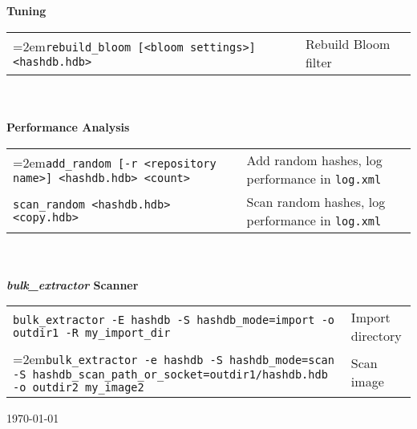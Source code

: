 \documentclass[12pt]{article}
\newcommand{\bulk}{\emph{bulk\_extractor}\xspace}
\begin{document}
\\
\\
\textbf{Tuning}\\
\begin{tabular}{p{3.6 in} p{4 in}}
\hangindent=2em\small\texttt{rebuild\_bloom [<bloom settings>] <hashdb.hdb>} & Rebuild Bloom filter \\
\end{tabular}
\\
\\
\textbf{Performance Analysis}\\
\begin{tabular}{p{3.6 in} p{4 in}}
\hangindent=2em\small\texttt{add\_random [-r <repository name>] <hashdb.hdb> <count>} & Add random hashes, log performance in \texttt{log.xml}\\
\small\texttt{scan\_random <hashdb.hdb> <copy.hdb>} & Scan random hashes, log performance in \texttt{log.xml}\\
\end{tabular}
\\
\\
\textbf{\bulk Scanner}\\
\begin{tabular}{p{5.8 in} l}
\small\texttt{bulk\_extractor -E hashdb -S hashdb\_mode=import -o outdir1 -R my\_import\_dir} & Import directory\\
\hangindent=2em\small\texttt{bulk\_extractor -e hashdb -S hashdb\_mode=scan -S hashdb\_scan\_path\_or\_socket=outdir1/hashdb.hdb -o outdir2 my\_image2} & Scan image\\
\end{tabular}

\vspace{2mm}
\begin{center}
\begin{footnotesize}
\today
\end{footnotesize}
\end{center}
\end{document}
